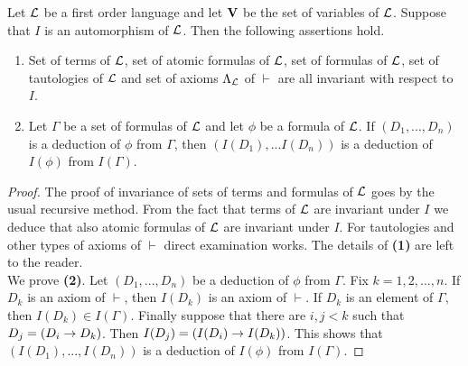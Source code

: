 \begin{theorem}\label{theorem:invariance_under_automorphisms}
Let ${\mathcal L}$ be a first order language and let $\mathbf{V}$ be the set of variables of ${\mathcal L}$. Suppose that $I$ is an automorphism of ${\mathcal L}$. Then the following assertions hold.
\begin{enumerate}[label=\textbf{\emph{(\arabic*)}}, leftmargin=3.0em]
\item Set of terms of ${\mathcal L}$, set of atomic formulas of ${\mathcal L}$, set of formulas of ${\mathcal L}$, set of tautologies of ${\mathcal L}$ and set of
axioms $\Lambda_{{\mathcal L}}$ of $\vdash$ are all invariant with respect to $I$.
\item Let $\Gamma$ be a set of formulas of ${\mathcal L}$ and let $\phi$ be a formula of ${\mathcal L}$. If $(D_1 , ..., D_n)$ is a deduction of $\phi$ from $\Gamma$, then $(I(D_1 ), ...I(D_n))$ is a deduction of $I(\phi)$ from $I(\Gamma)$.
\end{enumerate}
\end{theorem}
\begin{proof}
The proof of invariance of sets of terms and formulas of ${\mathcal L}$ goes by the usual recursive method. From the fact that terms of ${\mathcal L}$ are invariant under $I$ we deduce that also atomic formulas of ${\mathcal L}$ are invariant under $I$. For tautologies and other types of axioms of $\vdash$ direct examination works. The details of \textbf{(1)} are left to the reader.\\
We prove \textbf{(2)}. Let $(D_1 , ..., D_n)$ be a deduction of $\phi$ from $\Gamma$. Fix $k=1, 2, ..., n$. If $D_k$ is an axiom of $\vdash$, then $I(D_k)$ is an axiom of $\vdash$. If $D_k$ is an element of $\Gamma$, then $I(D_k) \in I(\Gamma)$. Finally suppose that there are $i, j < k$ such that $D_j = (D_i \rightarrow D_k)$. Then $I(D_j) = \left(I(D_i) \rightarrow I(D_k)\right)$. This shows that $(I(D_1), ..., I(D_n))$ is a deduction of $I(\phi)$ from $I(\Gamma)$.
\end{proof}

